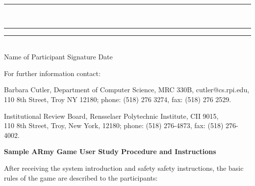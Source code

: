 \documentclass[10pt]{article}
\begin{document}
\vspace{0.5in}

\noindent
\rule{2.6in}{1pt}~~~~\rule{2.6in}{1pt}\hfill \rule{1in}{1pt}\\
\hspace*{0.7in}Name of Participant 
\hfill Signature \hspace{1.3in} 
Date \hspace{0.3in}

\vspace{0.15in}
\noindent
For further information contact:

\noindent
Barbara Cutler, Department of Computer Science, MRC 330B, cutler@cs.rpi.edu,\\
110 8th Street, Troy NY 12180; phone: (518) 276 3274, fax: (518) 276 2529.

\noindent
Institutional Review Board, Rensselaer Polytechnic Institute, CII 9015, \\
110 8th Street, Troy, New York, 12180; phone: (518) 276-4873, fax: (518) 276-4002.
\vspace{-0.8in}

\newpage

\noindent
{\bf {\Large Sample ARmy Game User Study Procedure and Instructions}}

\vspace{0.2in}
\noindent
After receiving the system introduction and safety safety
instructions, the basic rules of the game are described to the
participants:
\end{document}

